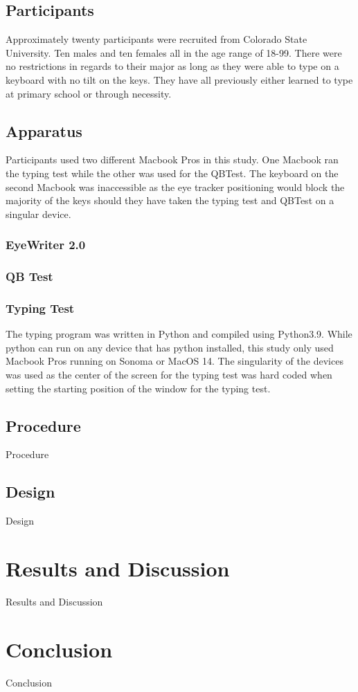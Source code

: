 \documentclass[manuscript, screen, review]{acmart} %
\begin{document}
  \subsection[short]{Participants}
  Approximately twenty participants were recruited from Colorado State University. Ten males and ten females all in the age range of 18-99. There were no %
  restrictions in regards to their major as long as they were able to type on a keyboard with no tilt on the keys.
  They have all previously either learned to type at primary school or through necessity.

  \subsection[short]{Apparatus}  %
  Participants used two different Macbook Pros in this study. One Macbook ran the typing test while the other was used for the QBTest. 
  The keyboard on the second Macbook was inaccessible as the eye tracker positioning would block the majority of the keys should they have 
  taken the typing test and QBTest on a singular device.

  \subsubsection{EyeWriter 2.0}
  \subsubsection{QB Test}
  \subsubsection{Typing Test}
  The typing program was written in Python and compiled using Python3.9. While python can run on any device that has python installed, this study only used Macbook Pros running on Sonoma or MacOS 14. The singularity of the devices was used as the center of the screen for the typing test was hard coded when setting the starting position of the window for the typing test. 

  \subsection[short]{Procedure}
  Procedure 

  \subsection[short]{Design}
  Design

\section{Results and Discussion}
  Results and Discussion

\section{Conclusion}
  Conclusion



\end{document}
